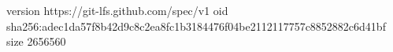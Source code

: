 version https://git-lfs.github.com/spec/v1
oid sha256:adec1da57f8b42d9c8c2ea8fc1b3184476f04be2112117757c8852882c6d41bf
size 2656560
